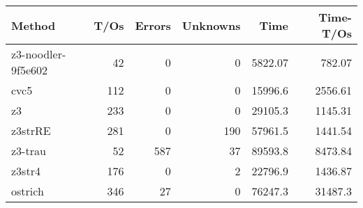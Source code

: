 \begin{tabular}{lrrrrr}
\hline
 Method             &   T/Os &   Errors &   Unknowns &     Time &   Time-T/Os \\
\hline
 z3-noodler-9f5e602 &     42 &        0 &          0 &  5822.07 &      782.07 \\
 cvc5               &    112 &        0 &          0 & 15996.6  &     2556.61 \\
 z3                 &    233 &        0 &          0 & 29105.3  &     1145.31 \\
 z3strRE            &    281 &        0 &        190 & 57961.5  &     1441.54 \\
 z3-trau            &     52 &      587 &         37 & 89593.8  &     8473.84 \\
 z3str4             &    176 &        0 &          2 & 22796.9  &     1436.87 \\
 ostrich            &    346 &       27 &          0 & 76247.3  &    31487.3  \\
\hline
\end{tabular}
